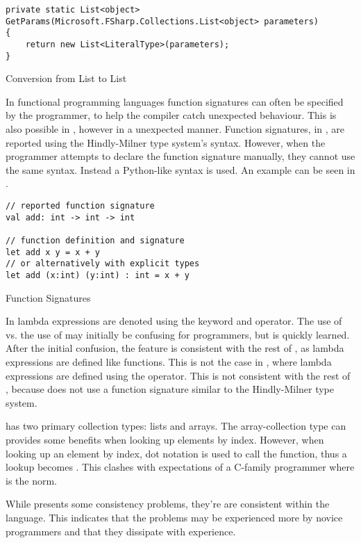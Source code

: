 \begin{listing}[H]
\begin{verbatim}
private static List<object> GetParams(Microsoft.FSharp.Collections.List<object> parameters)
{
    return new List<LiteralType>(parameters);
}
\end{verbatim}
\caption{Conversion from \fs List to \cs List}
\label{lst:list-conv}
\end{listing}

In functional programming languages function signatures can often be specified by the programmer, to help the compiler catch unexpected behaviour. This is also possible in \fs, however in a unexpected manner. Function signatures, in \fs, are reported using the Hindly-Milner type system's syntax\cite{fsharp:type:inference}. However, when the programmer attempts to declare the function signature manually, they cannot use the same syntax. Instead a Python-like syntax is used. An example can be seen in .

\begin{listing}[H]
\begin{verbatim}
// reported function signature
val add: int -> int -> int

// function definition and signature
let add x y = x + y
// or alternatively with explicit types
let add (x:int) (y:int) : int = x + y
\end{verbatim}
\caption{Function Signatures}
\label{lst:fun-sig}
\end{listing}

In \fs lambda expressions are denoted using the  keyword and \ttt{-\textgreater} operator. The use of  vs. the use of  may initially be confusing for programmers, but is quickly learned. After the initial confusion, the feature is consistent with the rest of \fs, as lambda expressions are defined like functions. This is not the case in \cs, where lambda expressions are defined using the \ttt{=\textgreater} operator. This is not consistent with the rest of \cs, because \cs does not use a function signature similar to the Hindly-Milner type system.

\fs has two primary collection types: lists and arrays. The array-collection type can provides some benefits when looking up elements by index.  However, when looking up an element by index, dot notation is used to call the \ttt{[]} function, thus a lookup becomes . This clashes with expectations of a C-family programmer where  is the norm.

While \fs presents some consistency problems, they're are consistent within the language. This indicates that the problems may be experienced more by novice programmers and that they dissipate with experience.
